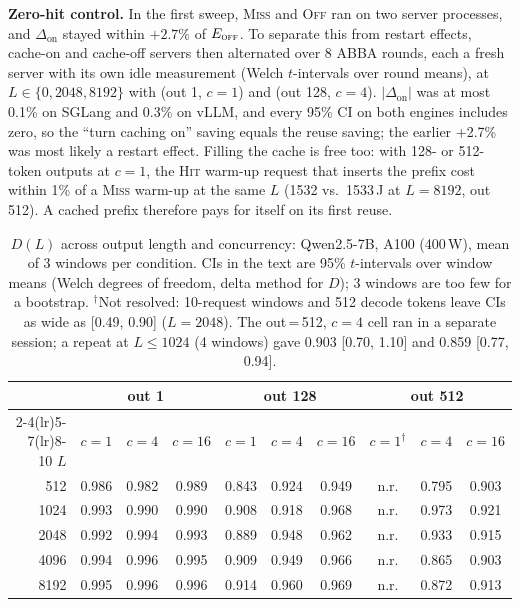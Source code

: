 \documentclass[conference]{IEEEtran}
\begin{document}
\textbf{Zero-hit control.} In the first sweep, \textsc{Miss} and \textsc{Off} ran on two server processes, and $\Delta_{\text{on}}$ stayed within $+2.7\%$ of $E_{\textsc{off}}$. To separate this from restart effects, cache-on and cache-off servers then alternated over 8 ABBA rounds, each a fresh server with its own idle measurement (Welch $t$-intervals over round means), at $L\in\{0, 2048, 8192\}$ with (out 1, $c{=}1$) and (out 128, $c{=}4$). $|\Delta_{\text{on}}|$ was at most 0.1\% on SGLang and 0.3\% on vLLM, and every 95\% CI on both engines includes zero, so the ``turn caching on'' saving equals the reuse saving; the earlier +2.7\% was most likely a restart effect. Filling the cache is free too: with 128- or 512-token outputs at $c{=}1$, the \textsc{Hit} warm-up request that inserts the prefix cost within 1\% of a \textsc{Miss} warm-up at the same $L$ (1532 vs.\ 1533\,J at $L{=}8192$, out 512). A cached prefix therefore pays for itself on its first reuse.

\begin{table}[t]
\caption{$D(L)$ across output length and concurrency: Qwen2.5-7B, A100 (400\,W), mean of 3 windows per condition. CIs in the text are 95\% $t$-intervals over window means (Welch degrees of freedom, delta method for $D$); 3 windows are too few for a bootstrap. $^\dagger$Not resolved: 10-request windows and 512 decode tokens leave CIs as wide as [0.49, 0.90] ($L{=}2048$). The out\,=\,512, $c{=}4$ cell ran in a separate session; a repeat at $L\le1024$ (4 windows) gave 0.903 {\scriptsize[0.70, 1.10]} and 0.859 {\scriptsize[0.77, 0.94]}.}
\label{tab:grid}
\centering
\footnotesize
\begin{tabular}{@{}rccccccccc@{}}
\toprule
 & \multicolumn{3}{c}{out 1} & \multicolumn{3}{c}{out 128} & \multicolumn{3}{c}{out 512} \\
\cmidrule(lr){2-4}\cmidrule(lr){5-7}\cmidrule(lr){8-10}
$L$ & $c{=}1$ & $c{=}4$ & $c{=}16$ & $c{=}1$ & $c{=}4$ & $c{=}16$ & $c{=}1^\dagger$ & $c{=}4$ & $c{=}16$ \\
\midrule
512  & 0.986 & 0.982 & 0.989 & 0.843 & 0.924 & 0.949 & n.r. & 0.795 & 0.903 \\
1024 & 0.993 & 0.990 & 0.990 & 0.908 & 0.918 & 0.968 & n.r. & 0.973 & 0.921 \\
2048 & 0.992 & 0.994 & 0.993 & 0.889 & 0.948 & 0.962 & n.r. & 0.933 & 0.915 \\
4096 & 0.994 & 0.996 & 0.995 & 0.909 & 0.949 & 0.966 & n.r. & 0.865 & 0.903 \\
8192 & 0.995 & 0.996 & 0.996 & 0.914 & 0.960 & 0.969 & n.r. & 0.872 & 0.913 \\
\bottomrule
\end{tabular}
\end{table}
\end{document}
